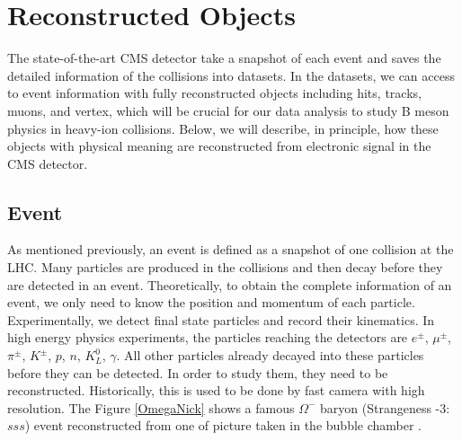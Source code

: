 \chapter{Reconstructed Objects}

The state-of-the-art CMS detector take a snapshot of each event and saves the detailed information of the collisions into datasets. In the datasets, we can access to event information with fully reconstructed objects including hits, tracks, muons, and vertex, which will be crucial for our data analysis to study B meson physics in heavy-ion collisions. Below, we will describe, in principle, how these objects with physical meaning are reconstructed from electronic signal in the CMS detector.

\section{Event}

As mentioned previously, an event is defined as a snapshot of one collision at the LHC. Many particles are produced in the collisions and then decay before they are detected in an event. Theoretically, to obtain the complete information of an event, we only need to know the position and momentum of each particle. Experimentally, we detect final state particles and record their kinematics. In high energy physics experiments, the particles reaching the detectors are $e^{\pm}$, $\mu^{\pm}$, $\pi^{\pm}$, $K^{\pm}$, $p$, $n$, $K^0_L$, $\gamma$. All other particles already decayed into these particles before they can be detected. In order to study them, they need to be reconstructed. Historically, this is used to be done by fast camera with high resolution. The Figure \ref{OmegaNick} shows a famous $\Omega^-$ baryon (Strangeness -3: $sss$) event reconstructed from one of picture taken in the bubble chamber \cite{OmegaNick}.

